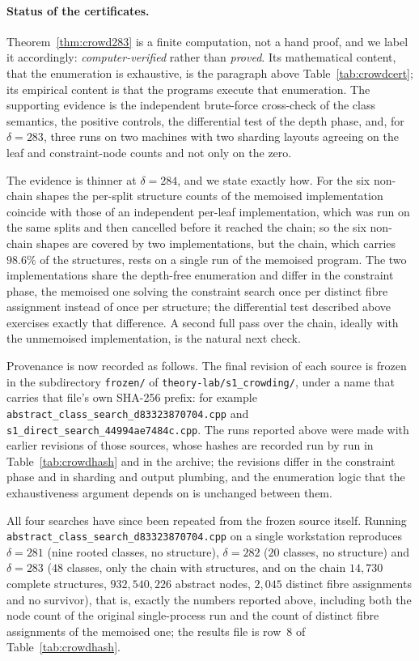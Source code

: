 \documentclass[11pt,a4paper]{article}
\theoremstyle{plain}
\theoremstyle{remark}
\newcommand{\tok}[1]{\texttt{#1}}
\newcommand{\bk}{\discretionary{}{}{}}
\begin{document}
\paragraph{Status of the certificates.}
Theorem~\ref{thm:crowd283} is a finite computation, not a hand proof, and we
label it accordingly: \emph{computer-verified} rather than \emph{proved}.  Its
mathematical content, that the enumeration is exhaustive, is the paragraph above
Table~\ref{tab:crowdcert}; its empirical content is that the programs execute
that enumeration.  The supporting evidence is the independent brute-force
cross-check of the class semantics, the positive controls, the differential test
of the depth phase, and, for $\delta=283$, three runs on two machines with two
sharding layouts agreeing on the leaf and constraint-node counts and not only on
the zero.

The evidence is thinner at $\delta=284$, and we state exactly how.  For the six
non-chain shapes the per-split structure counts of the memoised implementation
coincide with those of an independent per-leaf implementation, which was run on
the same splits and then cancelled before it reached the chain; so the six
non-chain shapes are covered by two implementations, but the chain, which
carries $98.6\%$ of the structures, rests on a single run of the memoised
program.  The two implementations share the depth-free enumeration and differ in
the constraint phase, the memoised one solving the constraint search once per
distinct fibre assignment instead of once per structure; the differential test
described above exercises exactly that difference.  A second full pass over the
chain, ideally with the unmemoised implementation, is the natural next check.

Provenance is now recorded as follows.  The final revision of each source is
frozen in the subdirectory \tok{frozen/} of
\tok{theory-lab/\bk s1\_\bk crowding/}, under a name that carries that file's
own SHA-256 prefix: for example
\tok{abstract\_\bk class\_\bk search\_\bk d83323870704.cpp} and
\tok{s1\_\bk direct\_\bk search\_\bk 44994ae7484c.cpp}.  The runs reported above
were made with earlier revisions of those sources, whose hashes are recorded run
by run in Table~\ref{tab:crowdhash} and in the archive; the revisions differ in
the constraint phase and in sharding and output plumbing, and the enumeration
logic that the exhaustiveness argument depends on is unchanged between them.

All four searches have since been repeated from the frozen source itself.
Running \tok{abstract\_\bk class\_\bk search\_\bk d83323870704.cpp} on a single
workstation reproduces $\delta=281$ (nine rooted classes, no structure),
$\delta=282$ ($20$ classes, no structure) and $\delta=283$ ($48$ classes, only
the chain with structures, and on the chain $14{,}730$ complete structures,
$932{,}540{,}226$ abstract nodes, $2{,}045$ distinct fibre assignments and no
survivor), that is, exactly the numbers reported above, including both the node
count of the original single-process run and the count of distinct fibre
assignments of the memoised one; the results file is row~8 of
Table~\ref{tab:crowdhash}.
\end{document}
